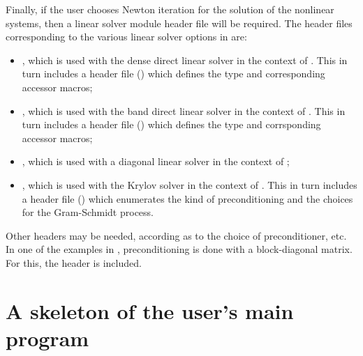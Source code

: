 Finally, if the user chooses Newton iteration for the solution of the nonlinear systems,
then a linear solver module header file will be required. 
The header files corresponding to the various linear solver options in {\cvode} are:
\begin{itemize}
\item {}, 
  which is used with the dense direct linear solver in 
  the context of {\cvode}. This in turn includes a header file ()
  which defines the  type and corresponding accessor macros; 
\item {}, 
  which is used with the band direct linear solver in the
  context of {\cvode}. This in turn includes a header file ()
  which defines the  type and corrsponding accessor macros;
\item {}, which is used with a diagonal linear solver in the
  context of {\cvode};
\item {}, 
  which is used with the Krylov solver {\spgmr} in the
  context of {\cvode}. This in turn includes a header file ()
  which enumerates the kind of preconditioning and the choices for the
  Gram-Schmidt process.
\end{itemize}

Other headers may be needed, according as to the choice of
preconditioner, etc. In one of the examples in \cite{}, preconditioning
is done with a block-diagonal matrix. For this, the header
 is included.

\section{A skeleton of the user's main program}\label{ss:skeleton_sim}


